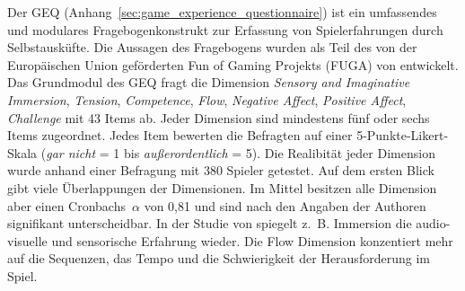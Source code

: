 Der \ac{GEQ} (Anhang~\ref{sec:game_experience_questionnaire}) ist ein umfassendes und modulares Fragebogenkonstrukt zur Erfassung von Spielerfahrungen durch Selbstausküfte. Die Aussagen des Fragebogens wurden als Teil des von der Europäischen Union geförderten Fun of Gaming Projekts (FUGA) von \citet{Ijsselsteijn2008} entwickelt. Das Grundmodul des GEQ fragt die 
Dimension \emph{Sensory and Imaginative Immersion}, \emph{Tension}, \emph{Competence}, \emph{Flow}, \emph{Negative Affect}, \emph{Positive Affect}, \emph{Challenge} mit 43 Items ab. Jeder Dimension sind mindestens fünf oder sechs Items zugeordnet. Jedes Item bewerten die Befragten auf einer 5-Punkte-Likert-Skala (\emph{gar nicht} = 1 bis \emph{außerordentlich} = 5). Die Realibität jeder Dimension wurde anhand einer Befragung mit 380 Spieler getestet. Auf dem ersten Blick gibt viele Überlappungen der Dimensionen. Im Mittel besitzen alle Dimension aber einen Cronbachs~$\alpha$ von 0,81 und sind nach den Angaben der Authoren signifikant unterscheidbar. In der Studie von \citet{Nacke2008} spiegelt z.~B. Immersion die audio-visuelle und sensorische Erfahrung wieder. Die Flow Dimension konzentiert mehr auf die Sequenzen, das Tempo und die Schwierigkeit der Herausforderung im Spiel.

